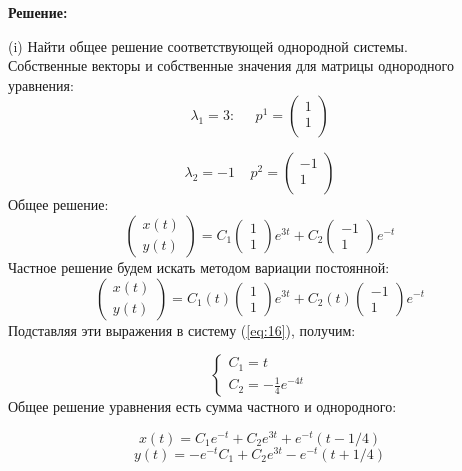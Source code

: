 \documentclass[a4paper, 12pt]{article}
\begin{document}
\textbf{Решение:} \par


(i) Найти общее решение соответствующей однородной системы.\\
Собственные векторы и собственные значения для матрицы однородного уравнения:
\[\lambda_1 = 3:\;\;\;\;\; p^1=
\left(
\begin{array}{cc}
1\\
1\\
\end{array}
\right)  
\]

\[\lambda_2=-1\;\;\;\; p^2=
\left(
\begin{array}{cc}
-1\\
1\\
\end{array}
\right) 
\]
Общее решение:
\[\left(
\begin{array}{c}
x(t)\\
y(t)
\end{array}
\right)=C_1\left(
\begin{array}{c}
1 \\
1
\end{array}
\right)e^{3t}+C_2\left(
\begin{array}{c}
-1 \\
1
\end{array}
\right)e^{-t}\]
Частное решение будем искать методом вариации постоянной:
\[\left(
\begin{array}{c}
x(t)\\
y(t)
\end{array}
\right)=C_1(t)\left(
\begin{array}{c}
1 \\
1
\end{array}
\right)e^{3t}+C_2(t)\left(
\begin{array}{c}
-1 \\
1
\end{array}
\right)e^{-t}\]
Подставляя эти выражения в систему (\ref{eq:16}), получим:

\[
\left\{
\begin{array}{lr}
C_1  = t\\
C_2 = -\frac 1 4 e^{-4t}
\end{array}
\right.
\]
Общее решение уравнения есть сумма частного и однородного:

\begin{equation}
x(t) = C_1e^{-t}+C_2e^{3t}+e^{-t}(t-1/4)
\label{eq:17}
\end{equation}
\begin{equation}
y(t) = -e^{-t}C_1+C_2e^{3t}-e^{-t}(t+1/4)
\label{eq:18}
\end{equation}
\end{document}

